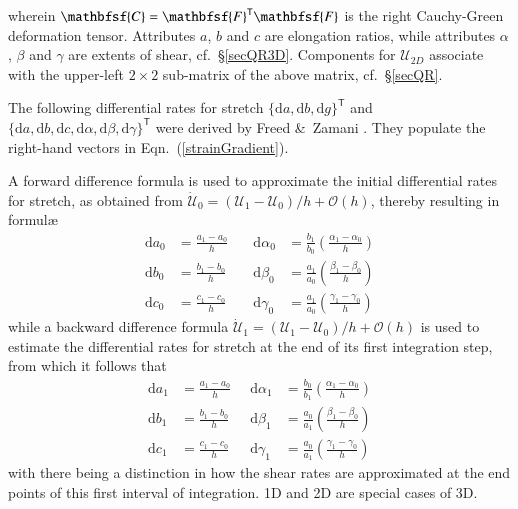 wherein $\mathbfsf{C} = \mathbfsf{F}^{\mathsf{T}} \mathbfsf{F}$ is the right Cauchy-Green deformation tensor.  Attributes $a$, $b$ and $c$ are elongation ratios, while attributes $\alpha$, $\beta$ and $\gamma$ are extents of shear, cf.\ \S\ref{secQR3D}.  Components for $\boldsymbol{\mathcal{U}}_{2D}$ associate with the upper-left $2 \! \times \! 2$ sub-matrix of the above matrix, cf.\ \S\ref{secQR}. 

The following differential rates for stretch $\{ \mathrm{d} a , \mathrm{d} b , \mathrm{d} g \}^{\mathsf{T}}$ and $\{ \mathrm{d} a , \mathrm{d} b , \mathrm{d} c , \mathrm{d} \alpha , \mathrm{d} \beta , \mathrm{d} \gamma \}^{\mathsf{T}}$ were derived by Freed \&\ Zamani \cite{FreedZamani18}.  They populate the right-hand vectors in Eqn.~(\ref{strainGradient}).

A forward difference formula is used to approximate the initial differential rates for stretch, as obtained from $\dot{\boldsymbol{\mathcal{U}}}_0 = ( \boldsymbol{\mathcal{U}}_1 -  \boldsymbol{\mathcal{U}}_0 ) / h + \mathcal{O}(h)$, thereby resulting in formul\ae\
\begin{equation}
\begin{aligned}
\mathrm{d} a_0 & = \frac {a_1 - a_0}{h} \quad &
\mathrm{d} \alpha_0 & 
= \frac{b_1}{b_0} \left(\frac{\alpha_1 - \alpha_0}{h} \right) \\
\mathrm{d} b_0 & = \frac {b_1 - b_0}{h} \quad & 
\mathrm{d} \beta_0 & 
= \frac{a_1}{a_0} \left( \frac{\beta_1 - \beta_0}{h} \right) \\
\mathrm{d} c_0 & = \frac {c_1 - c_0}{h} \quad & 
\mathrm{d} \gamma_0 & 
= \frac{a_1}{a_0} \left( \frac{\gamma_1 - \gamma_0}{h} \right)
\end{aligned}
\label{forwardDifference1stOrder}
\end{equation}
while a backward difference formula $\dot{\boldsymbol{\mathcal{U}}}_1 = ( \boldsymbol{\mathcal{U}}_1 -  \boldsymbol{\mathcal{U}}_0 ) / h + \mathcal{O}(h)$ is used to estimate the differential rates for stretch at the end of its first integration step, from which it follows that
\begin{equation}
\begin{aligned}
\mathrm{d} a_1 & = \frac {a_1 - a_0}{h} \;\; & 
\mathrm{d} \alpha_1 & 
= \frac {b_0}{b_1} \left( \frac{\alpha_1 - \alpha_0}{h} \right) \\
\mathrm{d} b_1 & = \frac {b_1 - b_0}{h} \;\; & 
\mathrm{d} \beta_1 & 
= \frac {a_0} {a_1} \left( \frac{\beta_1 - \beta_0}{h} \right) \\
\mathrm{d} c_1 & = \frac {c_1 - c_0}{h} \;\; & 
\mathrm{d} \gamma_1 & 
= \frac{a_0}{a_1} \left(\frac{\gamma_1 - \gamma_0}{h} \right)
\end{aligned}
\label{backwardDifference1stOrder}
\end{equation}
with there being a distinction in how the shear rates are approximated at the end points of this first interval of integration.  1D and 2D are special cases of 3D.


